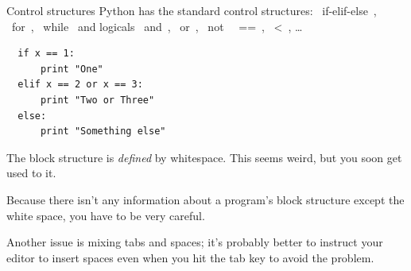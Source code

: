 \documentclass[10pt, t]{beamer}
\let\verb=\codeDelimTwiddles
\begin{document}
\begin{frame}[fragile,label=sec-2-10]{Control structures}
 Python has the standard control structures: \verb~if-elif-else~, \verb~for~, \verb~while~ and logicals \verb~and~, \verb~or~, 
\verb~not~ \verb~==~, \verb~<~, \ldots{}
\lstset{language=Python,label= ,caption= ,numbers=none}
\begin{lstlisting}
  if x == 1:
      print "One"
  elif x == 2 or x == 3:
      print "Two or Three"
  else:
      print "Something else"
\end{lstlisting}
The block structure is \emph{defined} by whitespace.
\pause This seems weird, but you soon get used to it.

\pause
Because there isn't any information about a program's block structure except the white space, you 
have to be very careful.  

\pause 
Another issue is mixing tabs and spaces;  it's probably better to instruct your editor to insert spaces even 
when you hit the tab key to avoid the problem.
\end{frame}

\end{document}
